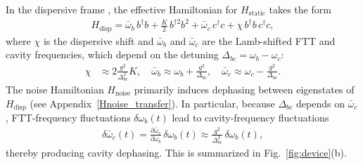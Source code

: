 In the dispersive frame \cite{Blais2021}, the effective Hamiltonian for $H_\text{static}$ takes the form
\begin{align}
\label{Hdisp}
H_\text{disp} =
\bar{\omega}_b\, b^\dagger b
+ \frac{K}{2}\, b^{\dagger 2} b^{2}
+ \bar{\omega}_c\, c^\dagger c
+ \chi\, b^\dagger b\, c^\dagger c,
\end{align}
where $\chi$ is the dispersive shift and $\bar{\omega}_b$ and $\bar{\omega}_c$ are the Lamb-shifted FTT and cavity frequencies, which depend on the detuning $\Delta_{bc}=\omega_b-\omega_c$:
\begin{align}
\chi &\approx 2\frac{g^2}{\Delta_{bc}^2}K,\quad
\bar{\omega}_b \approx \omega_b + \frac{g^2}{\Delta_{bc}}, \quad
\bar{\omega}_c \approx \omega_c - \frac{g^2}{\Delta_{bc}}.
\end{align}
The noise Hamiltonian $H_{\mathrm{noise}}$ primarily induces dephasing between eigenstates of $H_\text{disp}$ (see Appendix~\ref{Hnoise_transfer}). In particular, because $\Delta_{bc}$ depends on $\bar{\omega}_c$, FTT-frequency fluctuations $\delta\omega_b(t)$ lead to cavity-frequency fluctuations
\begin{align}
\delta\bar{\omega}_c(t)
= \frac{\partial \bar{\omega}_c}{\partial \omega_b}\,\delta\omega_b(t)
\approx \frac{g^2}{\Delta_{bc}^2}\,\delta\omega_b(t),
\end{align}
thereby producing cavity dephasing. This is summarized in Fig.~\ref{fig:device}(b).